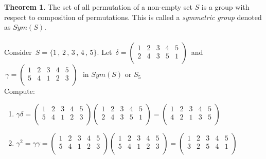 \documentclass[11pt,a4paper]{article}
\theoremstyle{definition}
\newtheorem{thm}{Theorem}[subsection]
\begin{document}
\begin{thm}
The set of all permutation of a non-empty set $S$ is a group with respect to composition of permutations. This is called a \textit{symmetric group} denoted as $Sym(S)$.\\\\



Consider $\, S = \{1\, , \, 2\,  , \, 3\, , \, 4\, , \, 5\}$. Let $\, \delta = \begin{pmatrix}
1 & 2  & 3 & 4 & 5\\
2 & 4 & 3 & 5 & 1\\
\end{pmatrix}\, $ and $\, \gamma = \begin{pmatrix}
1 & 2 & 3 & 4 & 5\\
5 & 4 & 1 & 2 & 3\\
\end{pmatrix}\,\, $ in $Sym(S)$ or $S_5$\\



Compute:
\begin{enumerate}
\item[(i)] $\gamma\delta = \begin{pmatrix}
1 & 2 & 3 & 4 & 5\\
5 & 4 & 1 & 2 & 3\\
\end{pmatrix} \begin{pmatrix}
1 & 2 & 3 & 4 & 5\\
2 & 4 & 3 & 5 & 1\\
\end{pmatrix}  = \begin{pmatrix}
1 & 2 & 3 & 4 & 5\\
4 & 2 & 1 & 3 & 5\\
\end{pmatrix}$\\

\item[(ii)] $\gamma^2 = \gamma\gamma = \begin{pmatrix}
1 & 2 & 3 & 4 & 5\\
5 & 4 & 1 & 2 & 3\\
\end{pmatrix}\begin{pmatrix}
1 & 2 & 3 & 4 & 5\\
5 & 4 & 1 & 2 & 3\\
\end{pmatrix}  = \begin{pmatrix}
1 & 2 & 3 & 4 & 5\\
3 & 2 & 5 & 4 & 1\\
\end{pmatrix}$\\


\end{enumerate}
\end{thm}
\end{document}
